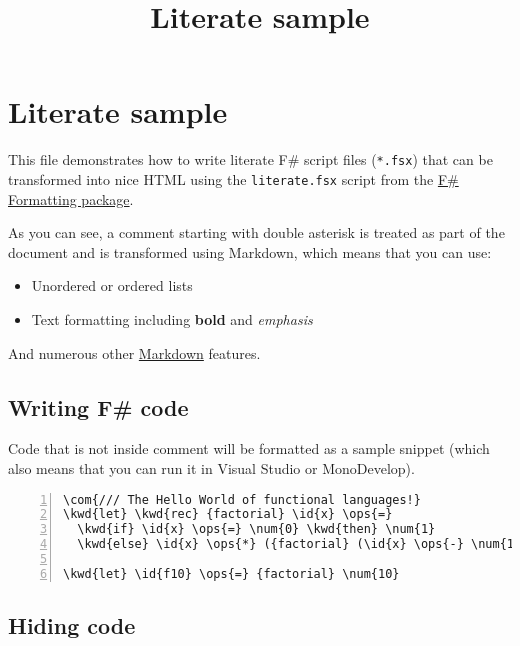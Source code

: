 \documentclass{article}
\title{Literate sample
}
\date{}
\newcommand{\id}[1]{\textcolor{black}{#1}}
\newcommand{\com}[1]{\textcolor{officegreen}{#1}}
\newcommand{\kwd}[1]{\textcolor{navy}{#1}}
\newcommand{\num}[1]{\textcolor{officegreen}{#1}}
\newcommand{\ops}[1]{\textcolor{purple}{#1}}
\begin{document}
\maketitle

\section*{Literate sample}



This file demonstrates how to write literate F\# script
files (\texttt{*.fsx}) that can be transformed into nice HTML
using the \texttt{literate.fsx} script from the \href{http://tpetricek.github.com/FSharp.Formatting}{F\# Formatting
package}.


As you can see, a comment starting with double asterisk
is treated as part of the document and is transformed 
using Markdown, which means that you can use:
\begin{itemize}
\item Unordered or ordered lists

\item Text formatting including \textbf{bold} and \emph{emphasis}

\end{itemize}



And numerous other \href{http://daringfireball.net/projects/markdown}{Markdown} features.
\subsection*{Writing F\# code}



Code that is not inside comment will be formatted as
a sample snippet (which also means that you can 
run it in Visual Studio or MonoDevelop).
\begin{Verbatim}[commandchars=\\\{\}, numbers=left]
\com{/// The Hello World of functional languages!}
\kwd{let} \kwd{rec} {factorial} \id{x} \ops{=} 
  \kwd{if} \id{x} \ops{=} \num{0} \kwd{then} \num{1} 
  \kwd{else} \id{x} \ops{*} ({factorial} (\id{x} \ops{-} \num{1}))

\kwd{let} \id{f10} \ops{=} {factorial} \num{10}
\end{Verbatim}

\subsection*{Hiding code}
\end{document}
